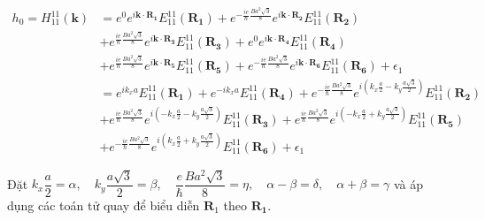 \documentclass{article}
\begin{document}
\begin{align*}
    h_0 = H_{11}^{11}(\textbf{k}) & = e^{0}e^{i\mathbf{k\cdot R_1}} E_{11}^{11}(\mathbf{R_1}) + e^{-\frac{ie}{\hbar}\frac{Ba^2\sqrt{3}}{8}}e^{i\mathbf{k\cdot R_2}} E_{11}^{11}(\mathbf{R_2})                                                                                                         \\
                                  & + e^{\frac{ie}{\hbar}\frac{Ba^2\sqrt{3}}{8}}e^{i\mathbf{k\cdot R_3}} E_{11}^{11}(\mathbf{R_3}) + e^{0}e^{i\mathbf{k\cdot R_4}} E_{11}^{11}(\mathbf{R_4})                                                                                                          \\
                                  & + e^{\frac{ie}{\hbar}\frac{Ba^2\sqrt{3}}{8}}e^{i\mathbf{k\cdot R_5}} E_{11}^{11}(\mathbf{R_5}) + e^{-\frac{ie}{\hbar}\frac{Ba^2\sqrt{3}}{8}}e^{i\mathbf{k\cdot R_6}} E_{11}^{11}(\mathbf{R_6}) + \epsilon_1                                                       \\
                                  & = e^{ik_xa}E_{11}^{11}(\mathbf{R_1}) + e^{-ik_xa}E_{11}^{11}(\mathbf{R_4}) + e^{-\frac{ie}{\hbar}\frac{Ba^2\sqrt{3}}{8}}e^{i\left(k_x\frac{a}{2} - k_y\frac{a\sqrt{3}}{2}\right)} E_{11}^{11}(\mathbf{R_2})                                                       \\
                                  & + e^{\frac{ie}{\hbar}\frac{Ba^2\sqrt{3}}{8}}e^{i\left(-k_x\frac{a}{2} - k_y\frac{a\sqrt{3}}{2}\right)} E_{11}^{11}(\mathbf{R_3}) + e^{\frac{ie}{\hbar}\frac{Ba^2\sqrt{3}}{8}}e^{i\left(-k_x\frac{a}{2} + k_y\frac{a\sqrt{3}}{2}\right)} E_{11}^{11}(\mathbf{R_5}) \\
                                  & + e^{-\frac{ie}{\hbar}\frac{Ba^2\sqrt{3}}{8}}e^{i\left(k_x\frac{a}{2} + k_y\frac{a\sqrt{3}}{2}\right)} E_{11}^{11}(\mathbf{R_6}) + \epsilon_1
\end{align*}

\noindent Đặt $k_x\dfrac{a}{2} = \alpha,\quad k_y\dfrac{a\sqrt{3}}{2} = \beta, \quad \dfrac{e}{\hbar}\dfrac{Ba^2\sqrt{3}}{8} = \eta ,\quad \alpha - \beta = \delta,\quad \alpha + \beta = \gamma$ và áp dụng các toán tử quay để biểu diễn ${\mathbf{R}}_1$ theo $\mathbf{R_1}$.
\end{document}
